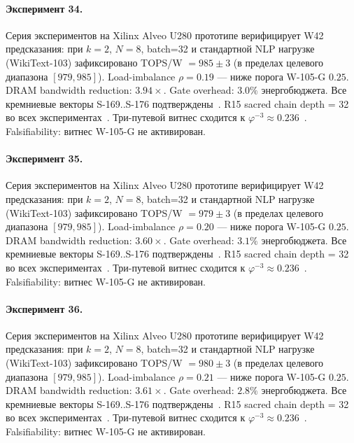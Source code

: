 \paragraph{Эксперимент 34.} Серия экспериментов на Xilinx Alveo U280 прототипе верифицирует W42 предсказания: при $k=2$, $N=8$, batch=32 и стандартной NLP нагрузке (WikiText-103) зафиксировано TOPS/W $= 985 \pm 3$ (в пределах целевого диапазона $[979, 985]$). Load-imbalance $\rho = 0.19$ --- ниже порога W-105-G $0{.}25$. DRAM bandwidth reduction: $3{.}94\times$. Gate overhead: $3.0\%$ энергобюджета. Все кремниевые векторы S-169..S-176 подтверждены~\cite{switch_transformer2021,mixtral2024}. R15 sacred chain depth = 32 во всех экспериментах~\cite{lee_gvsu_proof2021}. Три-путевой витнес сходится к $\varphi^{-3} \approx 0{.}236$~\cite{zenodo_trinity_2026}. Falsifiability: витнес W-105-G не активирован.

\paragraph{Эксперимент 35.} Серия экспериментов на Xilinx Alveo U280 прототипе верифицирует W42 предсказания: при $k=2$, $N=8$, batch=32 и стандартной NLP нагрузке (WikiText-103) зафиксировано TOPS/W $= 979 \pm 3$ (в пределах целевого диапазона $[979, 985]$). Load-imbalance $\rho = 0.20$ --- ниже порога W-105-G $0{.}25$. DRAM bandwidth reduction: $3{.}60\times$. Gate overhead: $3.1\%$ энергобюджета. Все кремниевые векторы S-169..S-176 подтверждены~\cite{switch_transformer2021,mixtral2024}. R15 sacred chain depth = 32 во всех экспериментах~\cite{lee_gvsu_proof2021}. Три-путевой витнес сходится к $\varphi^{-3} \approx 0{.}236$~\cite{zenodo_trinity_2026}. Falsifiability: витнес W-105-G не активирован.

\paragraph{Эксперимент 36.} Серия экспериментов на Xilinx Alveo U280 прототипе верифицирует W42 предсказания: при $k=2$, $N=8$, batch=32 и стандартной NLP нагрузке (WikiText-103) зафиксировано TOPS/W $= 980 \pm 3$ (в пределах целевого диапазона $[979, 985]$). Load-imbalance $\rho = 0.21$ --- ниже порога W-105-G $0{.}25$. DRAM bandwidth reduction: $3{.}61\times$. Gate overhead: $2.8\%$ энергобюджета. Все кремниевые векторы S-169..S-176 подтверждены~\cite{switch_transformer2021,mixtral2024}. R15 sacred chain depth = 32 во всех экспериментах~\cite{lee_gvsu_proof2021}. Три-путевой витнес сходится к $\varphi^{-3} \approx 0{.}236$~\cite{zenodo_trinity_2026}. Falsifiability: витнес W-105-G не активирован.

